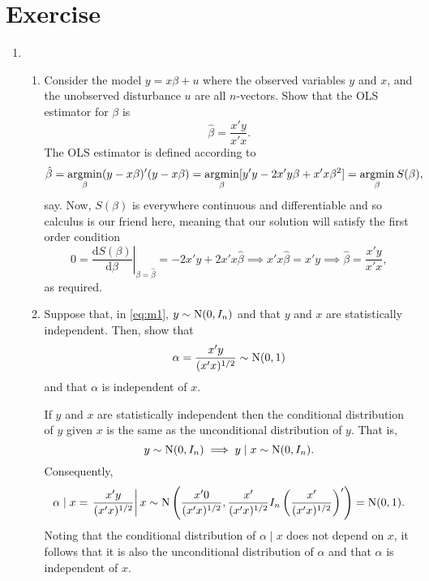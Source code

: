 \section*{Exercise}
\begin{enumerate}
   \item  
   \begin{enumerate}
      \item Consider the model \( y=x\beta+u \) where the observed variables \( y \) and \( x \), 
            and the unobserved disturbance \( u \) are all \( n \)-vectors.  Show that the 
            OLS estimator for \( \beta \) is 
            \begin{equation}
               \hat{\beta}=\frac{x'y}{x'x}.
               \label{eq:m1}
            \end{equation}
            \solution
            The OLS estimator is defined according to
            \[ 
               \hat{\beta}=\argmin_{\beta}(y-x\beta)'(y-x\beta)
               =\argmin_{\beta}[y'y-2x'y\beta+x'x\beta^{2}]=\argmin_{\beta}S(\beta), 
            \]
            say.  Now, \( S(\beta) \) is everywhere continuous and differentiable and so calculus is our 
            friend here, meaning that our solution will satisfy the first order condition
            \[
               0=\left.\frac{\mathrm{d} S(\beta)}{\mathrm{d} \beta}\right|_{\beta=\hat{\beta}} 
                =-2x'y+2x'x\hat{\beta}\implies x'x\hat{\beta}=x'y\implies\hat{\beta}=\frac{x'y}{x'x},
            \]
            as required.  
            
      \item Suppose that, in \eqref{eq:m1}, \( y\sim\operatorname{N}(0,I_{n}) \) and that \( y \) and \( x \) are 
            statistically independent.  Then, show that 
            \[ \alpha=\frac{x'y}{(x'x)^{1/2}}\sim\operatorname{N}(0,1) \]
            and that \( \alpha \) is independent of \( x \).
            
            \solution If \( y \) and \( x \) are statistically independent then the conditional
            distribution of \( y \) given \( x \) is the same as the unconditional distribution of
            \( y \).  That is, 
            \[ 
               y\sim\operatorname{N}(0,I_{n})\implies y\mid x\sim\operatorname{N}(0,I_{n}).
            \]
            Consequently,
            \[ 
               \alpha\mid x=\left.\frac{x'y}{(x'x)^{1/2}}\right| x\sim
               \operatorname{N}\left(\frac{x'0}{(x'x)^{1/2}},\frac{x'}{(x'x)^{1/2}}I_{n}\left(\frac{x'}{(x'x)^{1/2}}\right)'\right)
               =\operatorname{N}(0,1).
            \]
            Noting that the conditional distribution of \( \alpha\mid x \) does not depend on \( x 
            \), it follows that it is also the unconditional distribution of \( \alpha \) and that 
            \( \alpha \) is independent of \( x \).
            

\end{enumerate}
\end{enumerate}
